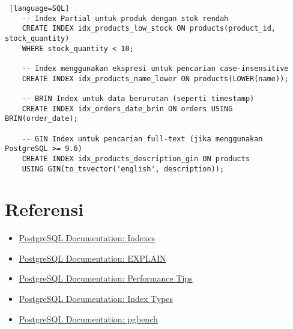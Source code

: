 \begin{lstlisting} [language=SQL]
	-- Index Partial untuk produk dengan stok rendah
	CREATE INDEX idx_products_low_stock ON products(product_id, stock_quantity) 
	WHERE stock_quantity < 10;
	
	-- Index menggunakan ekspresi untuk pencarian case-insensitive
	CREATE INDEX idx_products_name_lower ON products(LOWER(name));
	
	-- BRIN Index untuk data berurutan (seperti timestamp)
	CREATE INDEX idx_orders_date_brin ON orders USING BRIN(order_date);
	
	-- GIN Index untuk pencarian full-text (jika menggunakan PostgreSQL >= 9.6)
	CREATE INDEX idx_products_description_gin ON products 
	USING GIN(to_tsvector('english', description));
\end{lstlisting}

\section{Referensi}

\begin{itemize}
    \item \href{https://www.postgresql.org/docs/current/indexes.html}{PostgreSQL Documentation: Indexes}
    \item \href{https://www.postgresql.org/docs/current/using-explain.html}{PostgreSQL Documentation: EXPLAIN}
    \item \href{https://www.postgresql.org/docs/current/performance-tips.html}{PostgreSQL Documentation: Performance Tips}
    \item \href{https://www.postgresql.org/docs/current/indexes-types.html}{PostgreSQL Documentation: Index Types}
    \item \href{https://www.postgresql.org/docs/current/pgbench.html}{PostgreSQL Documentation: pgbench}
\end{itemize}

